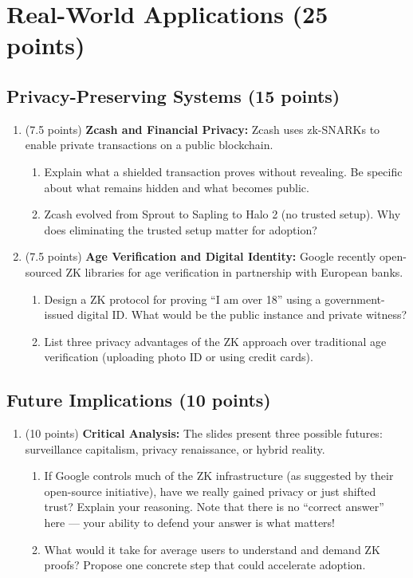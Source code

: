\documentclass[10pt,a4paper,american]{exam}
\begin{document}
\section{Real-World Applications (25 points)}

\subsection{Privacy-Preserving Systems (15 points)}

\begin{enumerate}
	\item (7.5 points) \textbf{Zcash and Financial Privacy:}
	      Zcash uses zk-SNARKs to enable private transactions on a public blockchain.
	      \begin{enumerate}
		      \item Explain what a shielded transaction proves without revealing. Be specific about what remains hidden and what becomes public.
		      \item Zcash evolved from Sprout to Sapling to Halo 2 (no trusted setup). Why does eliminating the trusted setup matter for adoption?
	      \end{enumerate}
	\item (7.5 points) \textbf{Age Verification and Digital Identity:}
	      Google recently open-sourced ZK libraries for age verification in partnership with European banks.
	      \begin{enumerate}
		      \item Design a ZK protocol for proving ``I am over 18'' using a government-issued digital ID. What would be the public instance and private witness?
		      \item List three privacy advantages of the ZK approach over traditional age verification (uploading photo ID or using credit cards).
	      \end{enumerate}
\end{enumerate}

\subsection{Future Implications (10 points)}

\begin{enumerate}
	\item (10 points) \textbf{Critical Analysis:}
	      The slides present three possible futures: surveillance capitalism, privacy renaissance, or hybrid reality.
	      \begin{enumerate}
		      \item If Google controls much of the ZK infrastructure (as suggested by their open-source initiative), have we really gained privacy or just shifted trust? Explain your reasoning. Note that there is no ``correct answer'' here — your ability to defend your answer is what matters!
		      \item What would it take for average users to understand and demand ZK proofs? Propose one concrete step that could accelerate adoption.
	      \end{enumerate}
\end{enumerate}
\end{document}
